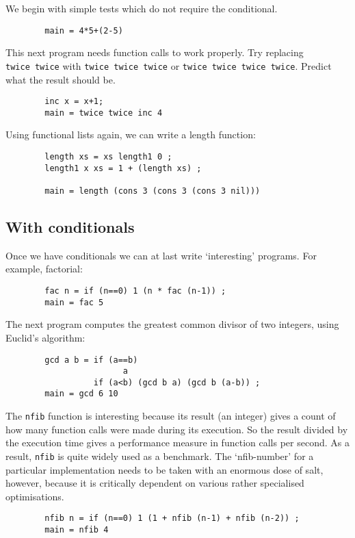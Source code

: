 We begin with simple tests which do not require the conditional.
\begin{verbatim}
        main = 4*5+(2-5)
\end{verbatim}
This next program needs function calls to work properly.  Try replacing
\mbox{\tt twice\ twice} with \mbox{\tt twice\ twice\ twice} or \mbox{\tt twice\ twice\ twice\ twice}.  Predict
what the result should be.
\begin{verbatim}
        inc x = x+1;
        main = twice twice inc 4
\end{verbatim}
Using functional lists again, we can write a length function:
\begin{verbatim}
        length xs = xs length1 0 ;
        length1 x xs = 1 + (length xs) ;

        main = length (cons 3 (cons 3 (cons 3 nil)))
\end{verbatim}

\subsection{With conditionals}

Once we have conditionals we can at last write `interesting' programs.
For example, factorial:
\begin{verbatim}
        fac n = if (n==0) 1 (n * fac (n-1)) ;
        main = fac 5
\end{verbatim}
The next program computes the greatest common divisor of two integers,
using Euclid's algorithm:
\begin{verbatim}
        gcd a b = if (a==b)
                        a
                  if (a<b) (gcd b a) (gcd b (a-b)) ;
        main = gcd 6 10
\end{verbatim}

The \mbox{\tt nfib} function is interesting because its result (an integer) gives
a count of how many function calls were made during its execution.  So
the result divided by the execution time gives a performance measure in
function calls per second.  As a result, \mbox{\tt nfib} is quite widely used as a
benchmark.  The `nfib-number' for a particular implementation needs to
be taken with an enormous
dose of salt, however, because it is critically dependent
on various rather specialised optimisations.
\begin{verbatim}
        nfib n = if (n==0) 1 (1 + nfib (n-1) + nfib (n-2)) ;
        main = nfib 4
\end{verbatim}

